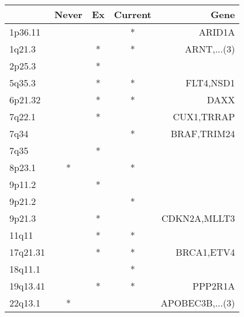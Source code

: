 \begin{tabular}{lcccr}
\toprule
{} & Never & Ex & Current &             Gene \\
\midrule
1p36.11  &       &    &       * &           ARID1A \\
1q21.3   &       &  * &       * &      ARNT,...(3) \\
2p25.3   &       &  * &         &                  \\
5q35.3   &       &  * &       * &        FLT4,NSD1 \\
6p21.32  &       &  * &       * &             DAXX \\
7q22.1   &       &  * &         &       CUX1,TRRAP \\
7q34     &       &    &       * &      BRAF,TRIM24 \\
7q35     &       &  * &         &                  \\
8p23.1   &     * &    &       * &                  \\
9p11.2   &       &  * &         &                  \\
9p21.2   &       &    &       * &                  \\
9p21.3   &       &  * &         &     CDKN2A,MLLT3 \\
11q11    &       &  * &       * &                  \\
17q21.31 &       &  * &       * &       BRCA1,ETV4 \\
18q11.1  &       &    &       * &                  \\
19q13.41 &       &  * &       * &          PPP2R1A \\
22q13.1  &     * &    &         &  APOBEC3B,...(3) \\
\bottomrule
\end{tabular}

